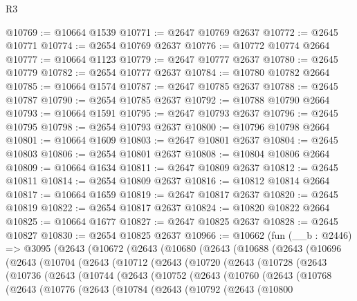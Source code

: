 \begin{lexlean}{R3}
\begin{coremodule}
@10769 := @10664 @1539
@10771 := @2647 @10769 @2637
@10772 := @2645 @10771
@10774 := @2654 @10769 @2637
@10776 := @10772 @10774 @2664
@10777 := @10664 @1123
@10779 := @2647 @10777 @2637
@10780 := @2645 @10779
@10782 := @2654 @10777 @2637
@10784 := @10780 @10782 @2664
@10785 := @10664 @1574
@10787 := @2647 @10785 @2637
@10788 := @2645 @10787
@10790 := @2654 @10785 @2637
@10792 := @10788 @10790 @2664
@10793 := @10664 @1591
@10795 := @2647 @10793 @2637
@10796 := @2645 @10795
@10798 := @2654 @10793 @2637
@10800 := @10796 @10798 @2664
@10801 := @10664 @1609
@10803 := @2647 @10801 @2637
@10804 := @2645 @10803
@10806 := @2654 @10801 @2637
@10808 := @10804 @10806 @2664
@10809 := @10664 @1634
@10811 := @2647 @10809 @2637
@10812 := @2645 @10811
@10814 := @2654 @10809 @2637
@10816 := @10812 @10814 @2664
@10817 := @10664 @1659
@10819 := @2647 @10817 @2637
@10820 := @2645 @10819
@10822 := @2654 @10817 @2637
@10824 := @10820 @10822 @2664
@10825 := @10664 @1677
@10827 := @2647 @10825 @2637
@10828 := @2645 @10827
@10830 := @2654 @10825 @2637
@10966 := @10662
    (fun (__b : @2446) =>
    @3095
      (@2643
        (@10672
          (@2643
            (@10680
              (@2643
                (@10688
                  (@2643
                    (@10696
                      (@2643
                        (@10704
                          (@2643
                            (@10712
                              (@2643
                                (@10720
                                  (@2643
                                    (@10728
                                      (@2643
                                        (@10736
                                          (@2643
                                            (@10744
                                              (@2643
                                                (@10752
                                                  (@2643
                                                    (@10760
                                                      (@2643
                                                        (@10768
                                                          (@2643
                                                            (@10776
                                                              (@2643
                                                                (@10784
                                                                  (@2643
                                                                    (@10792
                                                                      (@2643
                                                                        (@10800

\end{coremodule}
\end{lexlean}
